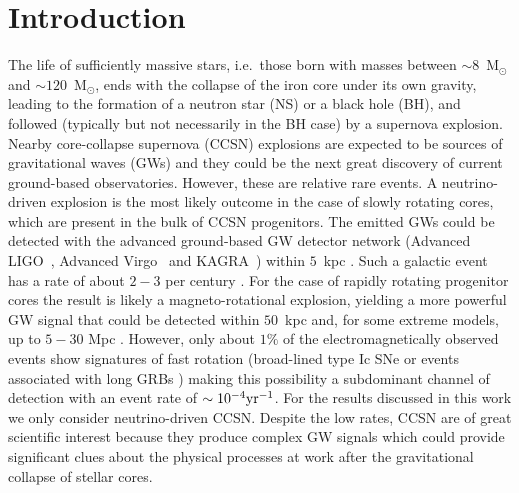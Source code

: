 
\section{Introduction}


The life of sufficiently massive stars, i.e.~those born with masses between $\sim 8$~M$_\odot$ and $\sim 120$~M$_\odot$, ends with the collapse of {the} iron core under {its} own gravity, leading {to} the formation of a neutron star {(NS)} or a black hole (BH), {and} followed (typically but not necessarily in the BH case) by {a supernova} explosion. Nearby core-collapse supernova (CCSN) explosions are expected to be sources of gravitational waves (GWs) and they could be 
the next great discovery of current ground-based observatories. However, these are relative rare events. A neutrino-driven explosion \citep{Bethe:1990} is the most likely outcome in the case of slowly rotating cores, which are present in the bulk of CCSN progenitors. The emitted GWs could be detected with the advanced ground-based GW detector network (Advanced LIGO~\citep{TheLIGOScientific:2014jea}, Advanced Virgo~\citep{TheVirgo:2014hva} and
KAGRA~\citep{Aso:2013eba}) within $5$~kpc \citep{Gossan:2016,TargetedSNSearchO12}. Such a galactic event has a rate of about $2-3$ per century \citep{Adams:2013,Rozwadowska:2021}.
For the case of rapidly rotating progenitor cores the result is likely a magneto-rotational explosion, yielding  a more powerful GW signal that could be detected within $50$~kpc and, for some extreme models, up to $5-30$ Mpc \citep{Gossan:2016,TargetedSNSearchO12}. However, only about $1\%$ of the electromagnetically observed events show signatures of fast rotation (broad-lined type Ic SNe \citep{Li:2011b} or events associated with long GRBs 
\citep{Chapman:2007}) making this possibility a subdominant channel of detection with an event rate of $\sim 10^{-4} \rm{yr}^{-1}$. For the results discussed in this work we only consider neutrino-driven CCSN.  Despite the low rates, CCSN are of great scientific interest because they produce complex GW signals which could provide significant clues about the physical processes at work after the gravitational collapse of stellar cores. 

